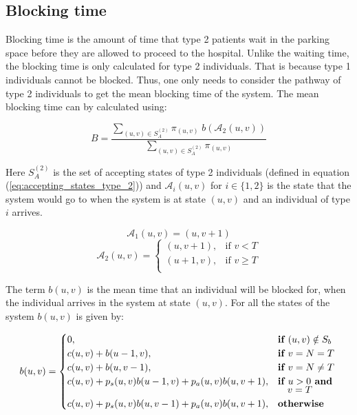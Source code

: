 \subsection{Blocking time}\label{sec:blocking_time}

Blocking time is the amount of time that type 2 patients wait in the parking 
space before they are allowed to proceed to the hospital.
Unlike the waiting time, the blocking time is only calculated for type 2 
individuals.  
That is because type 1 individuals cannot be blocked. 
Thus, one only needs to consider the pathway of type 2 individuals to get the 
mean blocking time of the system. 
The mean blocking time can by calculated using:

\begin{equation}\label{eq:algebraic_blocking_time}
    B = \frac{\sum_{(u,v) \in S_A^{(2)}} \pi_{(u,v)} \; 
    b(\mathcal{A}_2(u,v))}{\sum_{(u,v) \in S_A^{(2)}} \pi_{(u,v)}}
\end{equation}

Here \(S_A^{(2)}\) is the set of accepting states of type 2 individuals (defined
in equation (\ref{eq:accepting_states_type_2})) and \(\mathcal{A}_i(u,v)\) for
\(i \in \{1, 2\} \) is the state that the system would go to when the system is
at state \( (u,v) \) and an individual of type \(i\) arrives. 

\begin{equation}\label{eq:arriving_state_class_1}
    \mathcal{A}_1(u,v) = (u, v + 1)
\end{equation}
\begin{equation}\label{eq:arriving_state_class_2}
    \mathcal{A}_2(u,v) = 
    \begin{cases}
        (u, v + 1), & \text{if } v < T \\
        (u + 1, v), & \text{if } v \geq T \\
    \end{cases}
\end{equation}

The term \(b(u,v)\) is the mean time that an individual will be blocked for, 
when the individual arrives in the system at state \((u,v)\). 
For all the states of the system \(b(u,v)\) is given by:

\begin{equation}\label{eq:general_blocking_time_at_each_state}
    b(u,v) = 
    \begin{cases} 
        0, & \textbf{if } (u,v) \notin S_b \\
        c(u,v) + b(u - 1, v), & \textbf{if } v = N = T\\
        c(u,v) + b(u, v-1), & \textbf{if } v = N \neq T \\
        c(u,v) + p_s(u,v) b(u-1, v) + p_a(u,v) b(u, v+1), & \textbf{if } u > 0 
        \textbf{ and } \vspace{-0.2cm} \\ 
        & \quad v = T \\
        c(u,v) + p_s(u,v) b(u, v-1) + p_a(u,v) b(u, v+1), & \textbf{otherwise} \\
    \end{cases}
\end{equation}

